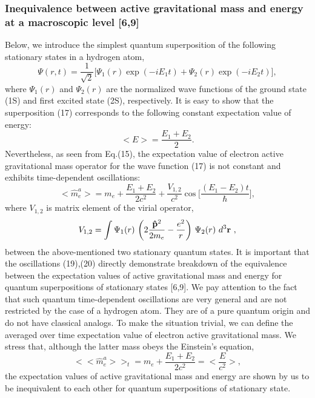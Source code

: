\documentclass{ws-ijmpd}
\begin{document}
\subsubsection{Inequivalence between active gravitational mass and
energy at a macroscopic level [6,9]}

Below, we introduce the simplest quantum superposition of the
following stationary states in a hydrogen atom,
\begin{equation}
\Psi (r,t) = \frac{1}{\sqrt{2}} \bigl[ \Psi_1(r) \exp(-iE_1t)
+ \Psi_2(r) \exp(-iE_2t) \bigl],
\end{equation}
where $\Psi_1(r)$ and $\Psi_2(r)$ are the normalized wave functions of the
ground state (1S) and first excited state (2S), respectively. It
is easy to show that the superposition (17) corresponds to the
following constant expectation value of energy:
\begin{equation}
<E> = \frac{E_1+E_2}{2}.
\end{equation}
Nevertheless, as seen from Eq.(15), the expectation value of
electron active gravitational mass operator for the wave function (17)
is not constant and exhibits time-dependent oscillations:
\begin{equation}
<\hat m^a_e> = m_e + \frac{E_1+E_2}{2 c^2} + \frac{V_{1,2}}{c^2}
\cos \biggl[ \frac{(E_1-E_2)t}{\hbar} \biggl],
\end{equation}
where $V_{1,2}$ is matrix element of the virial operator,
\begin{equation}
V_{1,2} = \int \Psi_1(r) \ \biggl(2\frac{{\bf \hat
p}^2}{2m_e}-\frac{e^2}{r}\biggl) \ \Psi_2(r) \ d^3{\bf r} \ ,
\end{equation}
between the above-mentioned two stationary quantum states. It is
important that the oscillations (19),(20) directly demonstrate
breakdown of the equivalence between the expectation values of
active gravitational mass and energy for quantum superpositions of
stationary states [6,9]. We pay attention to the fact that such quantum
time-dependent oscillations are very general and are not
restricted by the case of a hydrogen atom. They are of a pure
quantum origin and do not have classical analogs. To make the
situation trivial, we can define the averaged over time
expectation value of electron active gravitational mass. We stress that, although the latter mass obeys the Einstein's equation,
\begin{equation}
<<\hat m^a_e>>_t = m_e + \frac{E_1+E_2}{2 c^2} = \biggl<
\frac{E}{c^2} \biggl>,
\end{equation}
the expectation values of active gravitational mass and energy are
shown by us to be inequivalent to each other for quantum
superpositions of stationary state.
\end{document}
